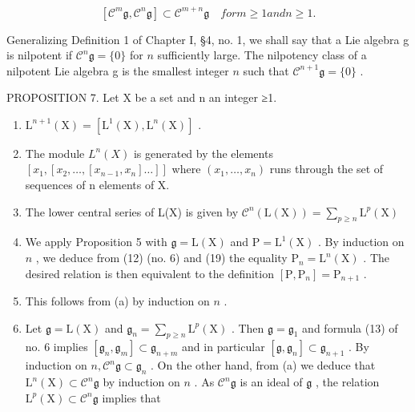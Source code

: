 \[
[ \mathcal {C} ^ {m} \mathfrak {g}, \mathcal {C} ^ {n} \mathfrak {g} ] \subset \mathcal {C} ^ {m + n} \mathfrak {g} \quad for m \geqslant 1 and n \geqslant 1.
\]

Generalizing Definition 1 of Chapter I, §4, no. 1, we shall say that a Lie algebra g is nilpotent if \(\mathcal{C}^{n}\mathfrak{g} = \{0\}\) for \(n\) sufficiently large. The nilpotency class of a nilpotent Lie algebra g is the smallest integer \(n\) such that \(\mathcal{C}^{n + 1}\mathfrak{g} = \{0\}\) .

PROPOSITION 7. Let X be a set and n an integer ≥1.

\begin{enumerate}
\def\labelenumi{(\alph{enumi})}
\item
  \(\mathrm{L}^{n+1}(\mathrm{X}) = [\mathrm{L}^{1}(\mathrm{X}), \mathrm{L}^{n}(\mathrm{X})]\) .
\item
  The module \(L^{n}(X)\) is generated by the elements \([x_{1}, [x_{2}, \ldots, [x_{n-1}, x_{n}] \ldots]]\) where \((x_{1}, \ldots, x_{n})\) runs through the set of sequences of n elements of X.
\item
  The lower central series of L(X) is given by \(\mathcal{C}^n (\mathrm{L}(\mathrm{X})) = \sum_{p\geqslant n}\mathrm{L}^p (\mathrm{X})\)
\item
  We apply Proposition 5 with \(\mathfrak{g} = \mathrm{L}(\mathrm{X})\) and \(\mathrm{P} = \mathrm{L}^{1}(\mathrm{X})\) . By induction on \(n\) , we deduce from (12) (no. 6) and (19) the equality \(\mathrm{P}_{n} = \mathrm{L}^{n}(\mathrm{X})\) . The desired relation is then equivalent to the definition \([\mathrm{P}, \mathrm{P}_{n}] = \mathrm{P}_{n + 1}\) .
\item
  This follows from (a) by induction on \(n\) .
\item
  Let \(\mathfrak{g} = \mathrm{L}(\mathrm{X})\) and \(\mathfrak{g}_{n} = \sum_{p\geqslant n}\mathrm{L}^{p}(\mathrm{X})\) . Then \(\mathfrak{g} = \mathfrak{g}_1\) and formula (13) of no. 6 implies \([\mathfrak{g}_{n},\mathfrak{g}_{m}]\subset \mathfrak{g}_{n + m}\) and in particular \([\mathfrak{g},\mathfrak{g}_n]\subset \mathfrak{g}_{n + 1}\) . By induction on \(n,\mathcal{C}^{n}\mathfrak{g}\subset \mathfrak{g}_{n}\) . On the other hand, from (a) we deduce that \(\mathrm{L}^{n}(\mathrm{X})\subset \mathcal{C}^{n}\mathfrak{g}\) by induction on \(n\) . As \(\mathcal{C}^{n}\mathfrak{g}\) is an ideal of \(\mathfrak{g}\) , the relation \(\mathrm{L}^p (\mathrm{X})\subset \mathcal{C}^{n}\mathfrak{g}\) implies that
\end{enumerate}

